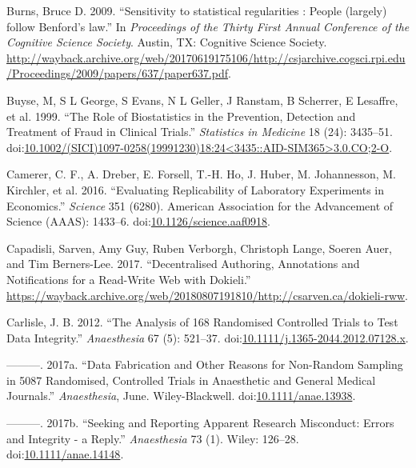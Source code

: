 \documentclass[a5paper]{book}
\begin{document}
\hypertarget{ref-Burns2009}{}
Burns, Bruce D. 2009. ``Sensitivity to statistical regularities : People
(largely) follow Benford's law.'' In \emph{Proceedings of the Thirty
First Annual Conference of the Cognitive Science Society}. Austin, TX:
Cognitive Science Society.
\url{http://wayback.archive.org/web/20170619175106/http://csjarchive.cogsci.rpi.edu/Proceedings/2009/papers/637/paper637.pdf}.

\hypertarget{ref-buyse1999}{}
Buyse, M, S L George, S Evans, N L Geller, J Ranstam, B Scherrer, E
Lesaffre, et al. 1999. ``The Role of Biostatistics in the Prevention,
Detection and Treatment of Fraud in Clinical Trials.'' \emph{Statistics
in Medicine} 18 (24): 3435--51.
doi:\href{https://doi.org/10.1002/(SICI)1097-0258(19991230)18:24\%3C3435::AID-SIM365\%3E3.0.CO;2-O}{10.1002/(SICI)1097-0258(19991230)18:24\textless{}3435::AID-SIM365\textgreater{}3.0.CO;2-O}.

\hypertarget{ref-doi:10.1126ux2fscience.aaf0918}{}
Camerer, C. F., A. Dreber, E. Forsell, T.-H. Ho, J. Huber, M.
Johannesson, M. Kirchler, et al. 2016. ``Evaluating Replicability of
Laboratory Experiments in Economics.'' \emph{Science} 351 (6280).
American Association for the Advancement of Science (AAAS): 1433--6.
doi:\href{https://doi.org/10.1126/science.aaf0918}{10.1126/science.aaf0918}.

\hypertarget{ref-dokieli}{}
Capadisli, Sarven, Amy Guy, Ruben Verborgh, Christoph Lange, Soeren
Auer, and Tim Berners-Lee. 2017. ``Decentralised Authoring, Annotations
and Notifications for a Read-Write Web with Dokieli.''
\url{https://wayback.archive.org/web/20180807191810/http://csarven.ca/dokieli-rww}.

\hypertarget{ref-doi:10.1111ux2fj.1365-2044.2012.07128.x}{}
Carlisle, J. B. 2012. ``The Analysis of 168 Randomised Controlled Trials
to Test Data Integrity.'' \emph{Anaesthesia} 67 (5): 521--37.
doi:\href{https://doi.org/10.1111/j.1365-2044.2012.07128.x}{10.1111/j.1365-2044.2012.07128.x}.

\hypertarget{ref-doi:10.1111ux2fanae.13938}{}
---------. 2017a. ``Data Fabrication and Other Reasons for Non-Random
Sampling in 5087 Randomised, Controlled Trials in Anaesthetic and
General Medical Journals.'' \emph{Anaesthesia}, June. Wiley-Blackwell.
doi:\href{https://doi.org/10.1111/anae.13938}{10.1111/anae.13938}.

\hypertarget{ref-doi:10.1111ux2fanae.14148}{}
---------. 2017b. ``Seeking and Reporting Apparent Research Misconduct:
Errors and Integrity - a Reply.'' \emph{Anaesthesia} 73 (1). Wiley:
126--28.
doi:\href{https://doi.org/10.1111/anae.14148}{10.1111/anae.14148}.
\end{document}
